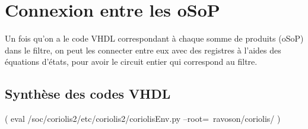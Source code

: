 \chapter{Connexion entre les oSoP}

Un fois qu'on a le code VHDL correspondant à chaque somme de produits (oSoP) dans le filtre, on peut les connecter entre eux avec des registres à l'aides des équations d'états, pour avoir le circuit entier qui correspond au filtre.


\section{Synthèse des codes VHDL}
( eval /soc/coriolis2/etc/coriolis2/coriolisEnv.py --root=~ravoson/coriolis/ )